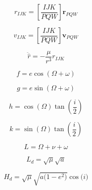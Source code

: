\documentclass[10pt]{article}
\begin{document}
\par\smallskip
\noindent\begin{minipage}[t]{0.2487\textwidth}
\[r_{IJK} = [\frac{IJK}{PQW}] \mathbf{r}_{PQW}\]
\end{minipage}%
\begin{minipage}[t]{0.2487\textwidth}
\[v_{IJK} = [\frac{IJK}{PQW}] \mathbf{v}_{PQW}\]
\end{minipage}%
\begin{minipage}[t]{0.2487\textwidth}
\[\ddot{\hat{r}} = - \frac{\mu}{r^{3}} r_{IJK}\]
\end{minipage}%
\begin{minipage}[t]{0.2487\textwidth}
\[f = e \cos{\left(\Omega + \omega \right)}\]
\end{minipage}
\par\smallskip
\noindent\begin{minipage}[t]{0.2487\textwidth}
\[g = e \sin{\left(\Omega + \omega \right)}\]
\end{minipage}%
\begin{minipage}[t]{0.2487\textwidth}
\[h = \cos{\left(\Omega \right)} \tan{\left(\frac{i}{2} \right)}\]
\end{minipage}%
\begin{minipage}[t]{0.2487\textwidth}
\[k = \sin{\left(\Omega \right)} \tan{\left(\frac{i}{2} \right)}\]
\end{minipage}%
\begin{minipage}[t]{0.2487\textwidth}
\[L = \Omega + \nu + \omega\]
\end{minipage}
\par\smallskip
\noindent\begin{minipage}[t]{0.2487\textwidth}
\[L_{d} = \sqrt{\mu} \sqrt{a}\]
\end{minipage}%
\begin{minipage}[t]{0.2487\textwidth}
\[H_{d} = \sqrt{\mu} \sqrt{a \bigl(1 - e^{2}\bigr)} \cos\bigl(i \bigr)\]
\end{minipage}
\par\smallskip
\clearpage
\end{document}
